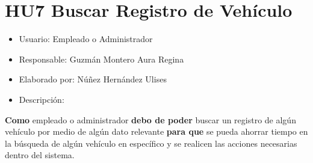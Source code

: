 \section{HU7 Buscar Registro de Vehículo}
\begin{itemize}
	\item Usuario: Empleado o Administrador
	\item Responsable: Guzmán Montero Aura Regina
	\item Elaborado por: Núñez Hernández Ulises
	\item Descripción:\\
\end{itemize}

\textbf{Como} empleado o administrador \textbf{debo de poder} buscar un registro de algún vehículo por medio de algún dato relevante \textbf{para que} se pueda ahorrar tiempo en la búsqueda de algún vehículo en específico y se realicen las acciones necesarias dentro del sistema. 